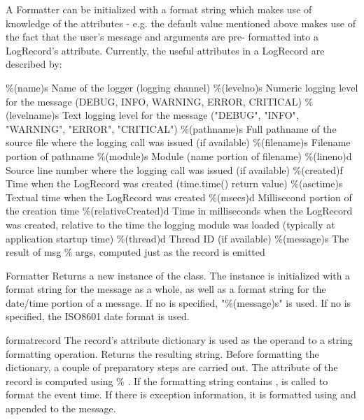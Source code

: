 A Formatter can be initialized with a format string which makes use of
knowledge of the  attributes - e.g. the default value
mentioned above makes use of the fact that the user's message and
arguments are pre- formatted into a LogRecord's 
attribute. Currently, the useful attributes in a LogRecord are
described by:

\%(name)s            Name of the logger (logging channel)
\%(levelno)s         Numeric logging level for the message (DEBUG, INFO,
                     WARNING, ERROR, CRITICAL)
\%(levelname)s       Text logging level for the message ("DEBUG", "INFO",
                     "WARNING", "ERROR", "CRITICAL")
\%(pathname)s        Full pathname of the source file where the logging
                     call was issued (if available)
\%(filename)s        Filename portion of pathname
\%(module)s          Module (name portion of filename)
\%(lineno)d          Source line number where the logging call was issued
                     (if available)
\%(created)f         Time when the LogRecord was created (time.time()
                     return value)
\%(asctime)s         Textual time when the LogRecord was created
\%(msecs)d           Millisecond portion of the creation time
\%(relativeCreated)d Time in milliseconds when the LogRecord was created,
                     relative to the time the logging module was loaded
                     (typically at application startup time)
\%(thread)d          Thread ID (if available)
\%(message)s         The result of msg \% args, computed just as the
                     record is emitted


\begin{classdesc}{Formatter}{}
Returns a new instance of the  class. The
instance is initialized with a format string for the message as a whole,
as well as a format string for the date/time portion of a message. If
no  is specified, "\%(message)s" is used. If no 
is specified, the ISO8601 date format is used.
\end{classdesc}

\begin{methoddesc}{format}{record}
The record's attribute dictionary is used as the operand to a
string formatting operation. Returns the resulting string.
Before formatting the dictionary, a couple of preparatory steps
are carried out. The  attribute of the record is computed
using  \% . If the formatting string contains
,  is called to format the
event time. If there is exception information, it is formatted using
 and appended to the message.
\end{methoddesc}

